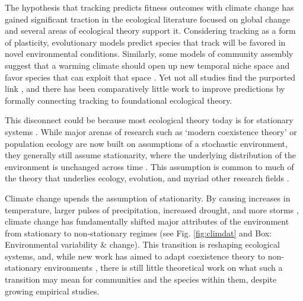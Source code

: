 \documentclass[11pt,letterpaper]{article}
\newcommand{\R}[1]{\label{#1}\linelabel{#1}}
\begin{document}
The hypothesis that tracking predicts fitness outcomes with climate change has gained significant traction in the ecological literature focused on global change \citep[e.g.,][]{Cleland:2012} and several areas of ecological theory support it. \R{r1sc1start} Considering tracking as a form of plasticity, evolutionary models predict species that track will be favored in novel environmental conditions. Similarly, some models of community assembly suggest that a warming climate should open up new temporal niche space and favor species that can exploit that space \citep{gotelli1996,wolkovich:2010fee,Zettlemoyer2019}. \R{r1sc2start} Yet not all studies find the purported link \citep[e.g.,][]{block2019}, and there has been comparatively little work to improve predictions by formally connecting tracking to foundational ecological theory. %

This disconnect could be because most ecological theory today is for stationary systems \citep[e.g.,][]{Sale:1977oq,Chesson:1997dz}. While major arenas of research such as `modern coexistence theory' or population ecology are now built on assumptions of a stochastic environment, they generally still assume stationarity, where the underlying distribution of the environment is unchanged across time \citep[i.e., constant mean and variance,][]{barabas2018}. This assumption is common to much of the theory that underlies ecology, evolution, and myriad other research fields \citep[e.g.,][]{Milly:2008yu,nosenko2013}. 

Climate change upends the assumption of stationarity. By causing increases in temperature, larger pulses of precipitation, increased drought, and more storms \citep{ipcc2013}, climate change has fundamentally shifted major attributes of the environment from stationary to non-stationary regimes (see Fig. \ref{fig:climdat} and Box: Environmental variability \& change). This transition is reshaping ecological systems, and, while new work has aimed to adapt coexistence theory to non-stationary environments \citep{chessonnonstat,volkerass}, there is still little theoretical work on what such a transition may mean for communities and the species within them, despite growing empirical studies.  %
\end{document}
